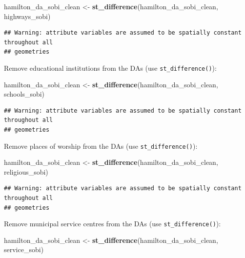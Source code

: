 \documentclass[
]{article}
\newenvironment{Shaded}{\begin{snugshade}}{\end{snugshade}}
\newcommand{\KeywordTok}[1]{\textcolor[rgb]{0.13,0.29,0.53}{\textbf{#1}}}
\newcommand{\NormalTok}[1]{#1}
\newcommand{\StringTok}[1]{\textcolor[rgb]{0.31,0.60,0.02}{#1}}
\begin{document}
\begin{Shaded}
\begin{Highlighting}[]
\NormalTok{hamilton_da_sobi_clean <-}\StringTok{ }\KeywordTok{st_difference}\NormalTok{(hamilton_da_sobi_clean, highways_sobi)}
\end{Highlighting}
\end{Shaded}

\begin{verbatim}
## Warning: attribute variables are assumed to be spatially constant throughout all
## geometries
\end{verbatim}

Remove educational institutions from the DAs (use
\texttt{st\_difference()}):

\begin{Shaded}
\begin{Highlighting}[]
\NormalTok{hamilton_da_sobi_clean <-}\StringTok{ }\KeywordTok{st_difference}\NormalTok{(hamilton_da_sobi_clean, schools_sobi)}
\end{Highlighting}
\end{Shaded}

\begin{verbatim}
## Warning: attribute variables are assumed to be spatially constant throughout all
## geometries
\end{verbatim}

Remove places of worship from the DAs (use \texttt{st\_difference()}):

\begin{Shaded}
\begin{Highlighting}[]
\NormalTok{hamilton_da_sobi_clean <-}\StringTok{ }\KeywordTok{st_difference}\NormalTok{(hamilton_da_sobi_clean, religious_sobi)}
\end{Highlighting}
\end{Shaded}

\begin{verbatim}
## Warning: attribute variables are assumed to be spatially constant throughout all
## geometries
\end{verbatim}

Remove municipal service centres from the DAs (use
\texttt{st\_difference()}):

\begin{Shaded}
\begin{Highlighting}[]
\NormalTok{hamilton_da_sobi_clean <-}\StringTok{ }\KeywordTok{st_difference}\NormalTok{(hamilton_da_sobi_clean, service_sobi)}
\end{Highlighting}
\end{Shaded}
\end{document}
